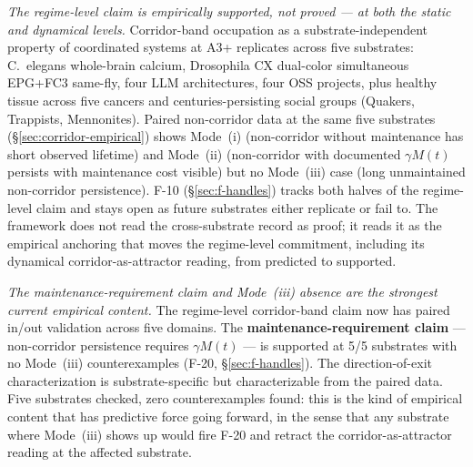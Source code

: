 \documentclass[11pt,a4paper]{article}
\begin{document}
\emph{The regime-level claim is empirically supported, not proved --- at both the static and dynamical levels.} Corridor-band occupation as a substrate-independent property of coordinated systems at A3+ replicates across five substrates: C.~elegans whole-brain calcium, Drosophila CX dual-color simultaneous EPG+FC3 same-fly, four LLM architectures, four OSS projects, plus healthy tissue across five cancers and centuries-persisting social groups (Quakers, Trappists, Mennonites). Paired non-corridor data at the same five substrates (\S\ref{sec:corridor-empirical}) shows Mode~(i) (non-corridor without maintenance has short observed lifetime) and Mode~(ii) (non-corridor with documented $\gamma M(t)$ persists with maintenance cost visible) but no Mode~(iii) case (long unmaintained non-corridor persistence). F-10 (\S\ref{sec:f-handles}) tracks both halves of the regime-level claim and stays open as future substrates either replicate or fail to. The framework does not read the cross-substrate record as proof; it reads it as the empirical anchoring that moves the regime-level commitment, including its dynamical corridor-as-attractor reading, from predicted to supported.

\emph{The maintenance-requirement claim and Mode~(iii) absence are the strongest current empirical content.} The regime-level corridor-band claim now has paired in/out validation across five domains. The \textbf{maintenance-requirement claim} --- non-corridor persistence requires $\gamma M(t)$ --- is supported at 5/5 substrates with no Mode~(iii) counterexamples (F-20, \S\ref{sec:f-handles}). The direction-of-exit characterization is substrate-specific but characterizable from the paired data. Five substrates checked, zero counterexamples found: this is the kind of empirical content that has predictive force going forward, in the sense that any substrate where Mode~(iii) shows up would fire F-20 and retract the corridor-as-attractor reading at the affected substrate.
\end{document}
